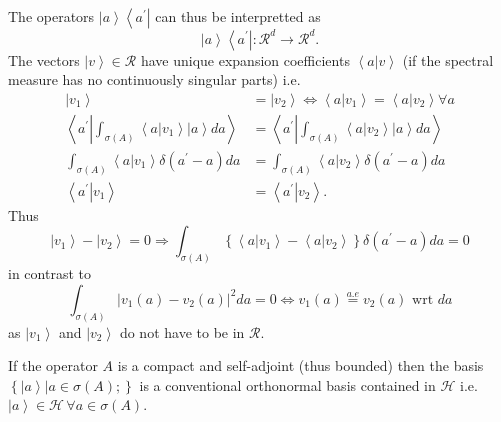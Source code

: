 \documentclass[aps,preprint]{revtex4}%
\begin{document}
The operators $\left\vert a\right\rangle \left\langle a^{\prime}\right\vert $
can thus be interpretted as
\begin{equation}
\left\vert a\right\rangle \left\langle a^{\prime}\right\vert :\mathcal{R}%
^{d}\rightarrow\mathcal{R}^{d}.
\end{equation}
The vectors $\left\vert v\right\rangle \in\mathcal{R}$ have unique expansion
coefficients $\left\langle \left.  a\right\vert v\right\rangle $ (if the
spectral measure has no continuously singular parts) i.e.
\begin{align}
\left\vert v_{1}\right\rangle  &  =\left\vert v_{2}\right\rangle
\Leftrightarrow\left\langle \left.  a\right\vert v_{1}\right\rangle
=\left\langle \left.  a\right\vert v_{2}\right\rangle \forall a\nonumber\\
\left\langle a^{\prime}\left\vert \int_{\sigma\left(  A\right)  }\left\langle
\left.  a\right\vert v_{1}\right\rangle \left\vert a\right\rangle da\right.
\right\rangle  &  =\left\langle a^{\prime}\left\vert \int_{\sigma\left(
A\right)  }\left\langle \left.  a\right\vert v_{2}\right\rangle \left\vert
a\right\rangle da\right.  \right\rangle \nonumber\\
\int_{\sigma\left(  A\right)  }\left\langle \left.  a\right\vert
v_{1}\right\rangle \delta\left(  a^{\prime}-a\right)  da  &  =\int%
_{\sigma\left(  A\right)  }\left\langle \left.  a\right\vert v_{2}%
\right\rangle \delta\left(  a^{\prime}-a\right)  da\nonumber\\
\left\langle \left.  a^{\prime}\right\vert v_{1}\right\rangle  &
=\left\langle \left.  a^{\prime}\right\vert v_{2}\right\rangle .
\end{align}
Thus%
\begin{equation}
\left\vert v_{1}\right\rangle -\left\vert v_{2}\right\rangle =0\Rightarrow
\int_{\sigma\left(  A\right)  }\left\{  \left\langle \left.  a\right\vert
v_{1}\right\rangle -\left\langle \left.  a\right\vert v_{2}\right\rangle
\right\}  \delta\left(  a^{\prime}-a\right)  da=0
\end{equation}
in contrast to
\begin{equation}
\int_{\sigma\left(  A\right)  }\left\vert v_{1}\left(  a\right)  -v_{2}\left(
a\right)  \right\vert ^{2}da=0\Leftrightarrow v_{1}\left(  a\right)
\overset{a.e}{=}v_{2}\left(  a\right)  \text{ wrt }da
\end{equation}
as $\left\vert v_{1}\right\rangle $ and $\left\vert v_{2}\right\rangle $ do
not have to be in $\mathcal{R}$.

If the operator $A$ is a compact \cite{Encyclo} and self-adjoint (thus
bounded) then the basis $\left\{  \left.  \left\vert a\right\rangle
\right\vert a\in\sigma\left(  A\right)  ;\right\}  $ is a conventional
orthonormal basis contained in $\mathcal{H}$ i.e. $\left\vert a\right\rangle
\in\mathcal{H\,}\forall a\in\sigma\left(  A\right)  .$
\end{document}
